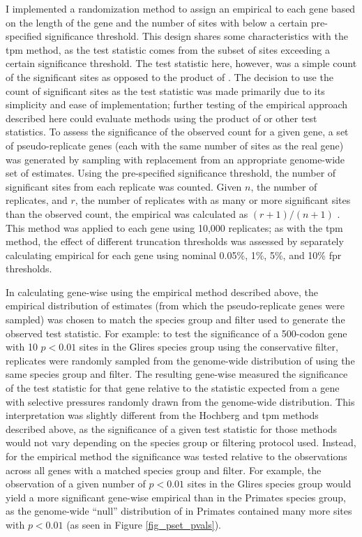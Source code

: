 I implemented a randomization method to assign an empirical \pv to
each gene based on the length of the gene and the number of sites with
\pvs below a certain pre-specified significance threshold. This design
shares some characteristics with the \ac{tpm} method, as the test
statistic comes from the subset of sites exceeding a certain
significance threshold. The test statistic here, however, was a simple
count of the significant sites as opposed to the product of \pvs. The
decision to use the count of significant sites as the test statistic
was made primarily due to its simplicity and ease of implementation;
further testing of the empirical approach described here could
evaluate methods using the product of \pvs or other test
statistics. To assess the significance of the observed count for a
given gene, a set of pseudo-replicate genes (each with the same number
of sites as the real gene) was generated by sampling with replacement
from an appropriate genome-wide set of \sw estimates. Using the
pre-specified significance threshold, the number of significant sites
from each replicate was counted. Given $n$, the number of replicates,
and $r$, the number of replicates with as many or more significant
sites than the observed count, the empirical \pv was calculated as
$(r+1) / (n+1)$ \citep{North2002}. This method was applied to each
gene using 10,000 replicates; as with the \ac{tpm} method, the effect
of different truncation thresholds was assessed by separately
calculating empirical \pvs for each gene using nominal 0.05\%, 1\%,
5\%, and 10\% \ac{fpr} thresholds.

In calculating gene-wise \pvs using the empirical method described
above, the empirical distribution of \sw estimates (from which the
pseudo-replicate genes were sampled) was chosen to match the species
group and \sw filter used to generate the observed test statistic. For
example: to test the significance of a 500-codon gene with 10 $p<0.01$
sites in the Glires species group using the conservative \sw filter,
replicates were randomly sampled from the genome-wide distribution of
\sw \pvs using the same species group and filter. The resulting
gene-wise \pv measured the significance of the test statistic for that
gene relative to the statistic expected from a gene with \sw selective
pressures randomly drawn from the genome-wide distribution. This
interpretation was slightly different from the Hochberg and \ac{tpm}
methods described above, as the significance of a given test statistic
for those methods would not vary depending on the species group or
filtering protocol used. Instead, for the empirical method the
significance was tested relative to the \sw observations across all
genes with a matched species group and filter. For example, the
observation of a given number of $p<0.01$ sites in the Glires species
group would yield a more significant gene-wise empirical \pv than in
the Primates species group, as the genome-wide ``null'' distribution
of \sw \pvs in Primates contained many more sites with $p<0.01$ (as
seen in Figure \ref{fig_pset_pvals}).

